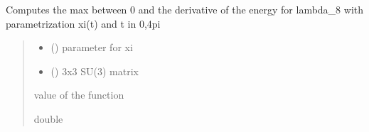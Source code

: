 \documentclass[letterpaper,10pt,english]{sphinxmanual}
\begin{document}

\begin{fulllineitems}
\label{\detokenize{numerical_reject:numerical_reject.derivee_f_lambda_8_plus}}
\pysigstartsignatures
\pysiglinewithargsret
{}
{\sphinxparamcomma {}}
{}
\pysigstopsignatures
\sphinxAtStartPar
Computes the max between 0 and the derivative of the energy for lambda\_8 with parametrization xi(t) and t in 0,4pi
\begin{quote}\begin{description}
\begin{itemize}
\item {} 
\sphinxAtStartPar
{} () \textendash{} parameter for xi

\item {} 
\sphinxAtStartPar
{} () \textendash{} 3x3 SU(3) matrix

\end{itemize}

\sphinxAtStartPar
value of the function

\sphinxAtStartPar
double

\end{description}\end{quote}

\end{fulllineitems}

\end{document}
